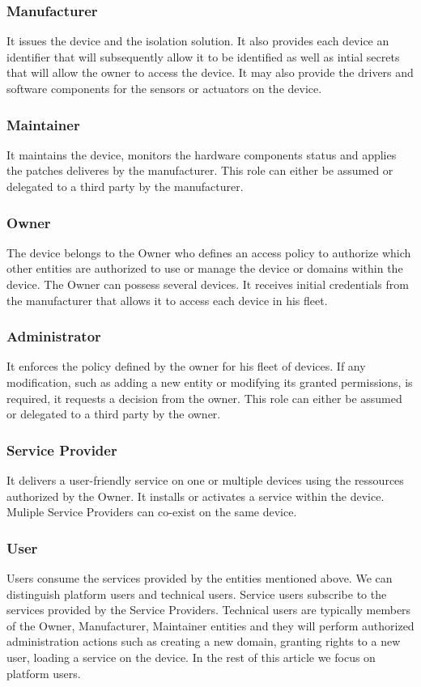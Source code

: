 \documentclass[conference]{IEEEtran}
\begin{document}
\subsubsection{Manufacturer}
It issues the device and the isolation solution. It also provides each device an identifier that will subsequently allow it to be identified as well as intial secrets that will allow the owner to access the device. It may also provide the drivers and software components for the sensors or actuators on the device. 
\subsubsection{Maintainer}
It maintains the device, monitors the hardware components status and applies the patches deliveres by the manufacturer. This role can either be assumed or delegated to a third party by the manufacturer. 
\subsubsection{Owner}
The device belongs to the Owner who defines an access policy to authorize which other entities are authorized to use or manage the device or domains within the device. The Owner can possess several devices. It receives initial credentials from the manufacturer that allows it to access each device in his fleet. 
\subsubsection{Administrator}
It enforces the policy defined by the owner for his fleet of devices. If any modification, such as adding a new entity or modifying its granted permissions,  is required, it requests a decision from the owner. This role can either be assumed or delegated to a third party by the owner. 
\subsubsection{Service Provider}
It delivers a user-friendly service on one or multiple devices using the ressources authorized by the Owner. It installs or activates a service within the device. Muliple Service Providers can co-exist on the same device. 
\subsubsection{User}
Users consume the services provided by the entities mentioned above. We can distinguish platform users and technical users. Service users subscribe to the services provided by the Service Providers. Technical users are typically members of the Owner, Manufacturer, Maintainer entities and they will perform authorized administration actions such as creating a new domain, granting rights to a new user, loading a service on the device. In the rest of this article we focus on platform users. 
\end{document}

